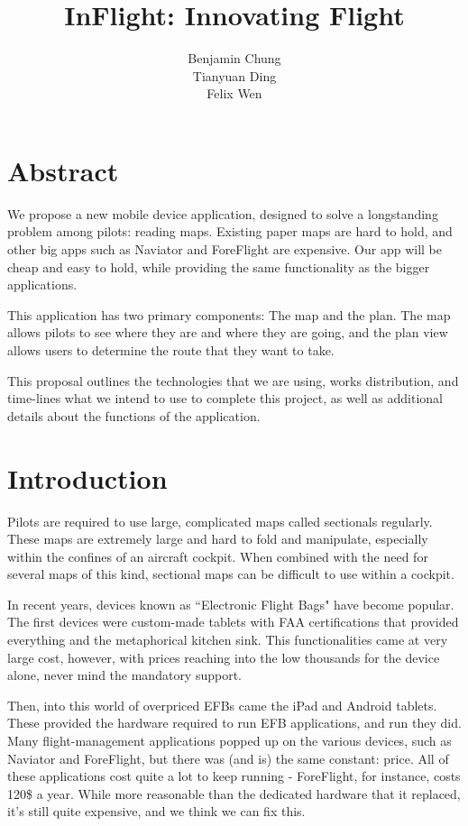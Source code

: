 \documentclass[10pt,a4paper]{article}
\author{Benjamin Chung\\ Tianyuan Ding\\ Felix Wen}
\title{\textbf{InFlight: Innovating Flight}}
\begin{document}
\maketitle
{}
\section*{Abstract}
We propose a new mobile device application, designed to solve a longstanding problem among pilots: reading maps. Existing paper maps are hard to hold, and other big apps such as Naviator and ForeFlight are expensive. Our app will be cheap and easy to hold, while providing the same functionality as the bigger applications.

This application has two primary components: The map and the plan. The map allows pilots to see where they are and where they are going, and the plan view allows users to determine the route that they want to take.

This proposal outlines the technologies that we are using, works distribution, and time-lines what we intend to use to complete this project, as well as additional details about the functions of the application.\newpage
\tableofcontents
\newpage
{}
\section{Introduction}
Pilots are required to use large, complicated maps called sectionals regularly. These maps are extremely large and hard to fold and manipulate, especially within the confines of an aircraft cockpit. When combined with the need for several maps of this kind, sectional maps can be difficult to use within a cockpit.

In recent years, devices known as ``Electronic Flight Bags" have become popular. The first devices were custom-made tablets with FAA certifications that provided everything and the metaphorical kitchen sink. This functionalities came at very large cost, however, with prices reaching into the low thousands for the device alone, never mind the mandatory support.

Then, into this world of overpriced EFBs came the iPad and Android tablets. These provided the hardware required to run EFB applications, and run they did. Many flight-management applications popped up on the various devices, such as Naviator and ForeFlight, but there was (and is) the same constant: price. All of these applications cost quite a lot to keep running - ForeFlight, for instance, costs 120\$ a year. While more reasonable than the dedicated hardware that it replaced, it's still quite expensive, and we think we can fix this.
\end{document}
